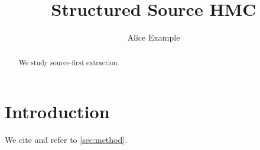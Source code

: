 \documentclass{article}
\begin{document}
\title{Structured Source HMC}
\author{Alice Example}
\maketitle
\begin{abstract}
We study source-first extraction.
\end{abstract}
\section{Introduction}\label{sec:intro}
We cite \cite{neal2011mcmc} and refer to \ref{sec:method}.


\end{document}
